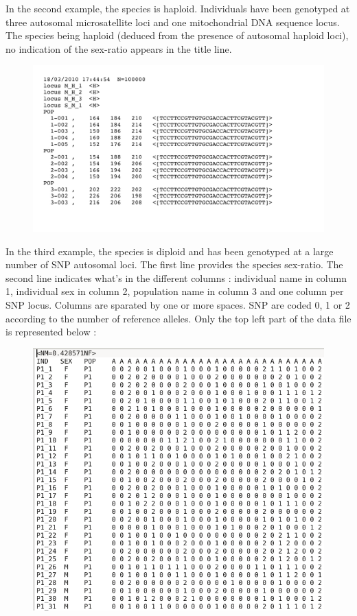 In the second example, the species is haploid. Individuals have been genotyped at three autosomal microsatellite loci and one mitochondrial DNA sequence locus. The species being haploid (deduced from the presence of autosomal haploid loci), no indication of the sex-ratio appears in the title line.

\begin{figure}[h]
\includegraphics[scale=0.6]{gui_pictures/screenga002.png}
\end{figure}

In the third example, the species is diploid and has been genotyped at a large number of SNP autosomal loci. The first line provides the species sex-ratio. The second line indicates what's in the different columns : individual name in column 1, individual sex in column 2, population name in column 3 and one column per SNP locus. Columns are sparated by one or more spaces. SNP are coded 0, 1 or 2 according to the number of reference alleles. Only the top left part of the data file is represented below :

\begin{figure}[h]
\includegraphics[scale=0.7]{gui_pictures/screenga003.png}
\end{figure}



